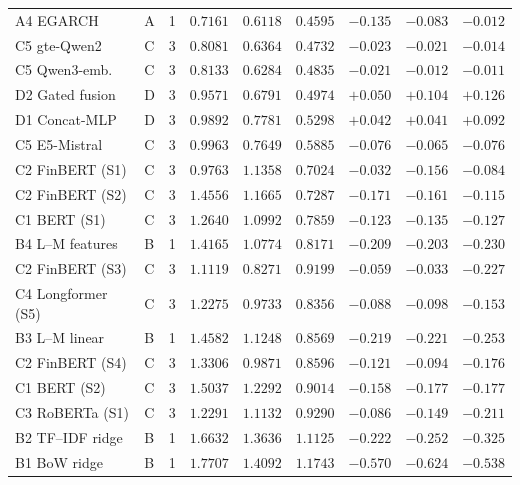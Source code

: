 \begin{table}[p]
\begin{tabular}{@{}llrrrrrrr@{}}
A4 EGARCH & A & 1 & $0.7161$ & $0.6118$ & $0.4595$ & $-0.135$ & $-0.083$ & $-0.012$ \\
C5 gte-Qwen2 & C & 3 & $0.8081$ & $0.6364$ & $0.4732$ & $-0.023$ & $-0.021$ & $-0.014$ \\
C5 Qwen3-emb. & C & 3 & $0.8133$ & $0.6284$ & $0.4835$ & $-0.021$ & $-0.012$ & $-0.011$ \\
D2 Gated fusion & D & 3 & $0.9571$ & $0.6791$ & $0.4974$ & $+0.050$ & $+0.104$ & $+0.126$ \\
D1 Concat-MLP & D & 3 & $0.9892$ & $0.7781$ & $0.5298$ & $+0.042$ & $+0.041$ & $+0.092$ \\
C5 E5-Mistral & C & 3 & $0.9963$ & $0.7649$ & $0.5885$ & $-0.076$ & $-0.065$ & $-0.076$ \\
C2 FinBERT (S1) & C & 3 & $0.9763$ & $1.1358$ & $0.7024$ & $-0.032$ & $-0.156$ & $-0.084$ \\
C2 FinBERT (S2) & C & 3 & $1.4556$ & $1.1665$ & $0.7287$ & $-0.171$ & $-0.161$ & $-0.115$ \\
C1 BERT (S1) & C & 3 & $1.2640$ & $1.0992$ & $0.7859$ & $-0.123$ & $-0.135$ & $-0.127$ \\
B4 L--M features & B & 1 & $1.4165$ & $1.0774$ & $0.8171$ & $-0.209$ & $-0.203$ & $-0.230$ \\
C2 FinBERT (S3) & C & 3 & $1.1119$ & $0.8271$ & $0.9199$ & $-0.059$ & $-0.033$ & $-0.227$ \\
C4 Longformer (S5) & C & 3 & $1.2275$ & $0.9733$ & $0.8356$ & $-0.088$ & $-0.098$ & $-0.153$ \\
B3 L--M linear & B & 1 & $1.4582$ & $1.1248$ & $0.8569$ & $-0.219$ & $-0.221$ & $-0.253$ \\
C2 FinBERT (S4) & C & 3 & $1.3306$ & $0.9871$ & $0.8596$ & $-0.121$ & $-0.094$ & $-0.176$ \\
C1 BERT (S2) & C & 3 & $1.5037$ & $1.2292$ & $0.9014$ & $-0.158$ & $-0.177$ & $-0.177$ \\
C3 RoBERTa (S1) & C & 3 & $1.2291$ & $1.1132$ & $0.9290$ & $-0.086$ & $-0.149$ & $-0.211$ \\
B2 TF--IDF ridge & B & 1 & $1.6632$ & $1.3636$ & $1.1125$ & $-0.222$ & $-0.252$ & $-0.325$ \\
B1 BoW ridge & B & 1 & $1.7707$ & $1.4092$ & $1.1743$ & $-0.570$ & $-0.624$ & $-0.538$ \\
\bottomrule
\end{tabular}
\end{table}

